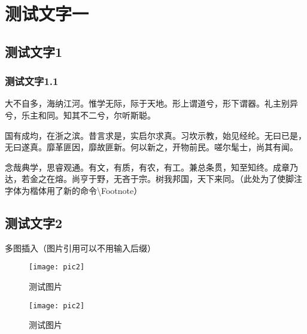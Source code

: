 \documentclass{../source/Paper}
\date{\today}
\begin{document}
    \makeheader

    \section{测试文字一}
        \subsection{测试文字1}
        \subsubsection{测试文字1.1}
        大不自多，海纳江河。惟学无际，际于天地。形上谓道兮，形下谓器。礼主别异兮，乐主和同。知其不二兮，尔听斯聪。\par
        国有成均，在浙之滨。昔言求是，实启尔求真。习坎示教，始见经纶。无曰已是，无曰遂真。靡革匪因，靡故匪新。何以新之，开物前民。嗟尔髦士，尚其有闻。\par
        念哉典学，思睿观通。有文，有质，有农，有工。兼总条贯，知至知终。成章乃达，若金之在熔。尚亨于野，无吝于宗。树我邦国，天下来同。（此处为了使脚注字体为楷体用了新的命令\textbackslash Footnote）
        \subsection{测试文字2}
        多图插入（图片引用可以不用输入后缀）
        \begin{figure}[htbp]
            \centering
            \begin{minipage}[t]{0.48\textwidth}
                \centering
                \texttt{[image: pic2]}
                \caption{测试图片}
            \end{minipage}
            \begin{minipage}[t]{0.48\textwidth}
                \centering
                \texttt{[image: pic2]}
                \caption{测试图片}
            \end{minipage}
        \end{figure}
\end{document}

